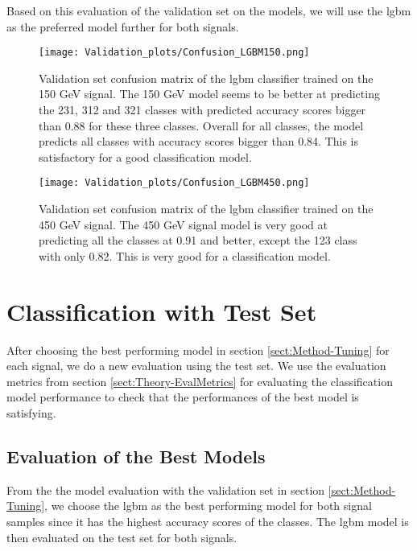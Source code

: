 \documentclass[a4paper, american, 12pt]{report}
\begin{document}
	Based on this evaluation of the validation set on the models, we will use the \acrshort{lgbm} as the preferred model further for both signals.
	\begin{figure}[t!]
		\centering\texttt{[image: Validation\_plots/Confusion\_LGBM150.png]}
		\caption[Validation set confusion matrix for the \acrshort{lgbm} model trained on the 150 GeV signal.]{Validation set confusion matrix of the \acrshort{lgbm} classifier trained on the 150 GeV signal. The 150 GeV model seems to be better at predicting the 231, 312 and 321 classes with predicted accuracy scores bigger than 0.88 for these three classes. Overall for all classes, the model predicts all classes with accuracy scores bigger than 0.84. This is satisfactory for a good classification model.  \label{fig:ConfVal_LGBM150}}
	\end{figure}
	\begin{figure}[t!]
		\centering\texttt{[image: Validation\_plots/Confusion\_LGBM450.png]}
		\caption[Validation set confusion matrix for the \acrshort{lgbm} model trained on the 450 GeV signal.]{Validation set confusion matrix of the \acrshort{lgbm} classifier trained on the 450 GeV signal. The 450 GeV signal model is very good at predicting all the classes at 0.91 and better, except the 123 class with only 0.82. This is very good for a classification model. \label{fig:ConfVal_LGBM450}}
	\end{figure}
	
	
	\newpage
	\section{Classification with Test Set}
	\label{sect:Method-BestModelEval}
	After choosing the best performing model in section \ref{sect:Method-Tuning} for each signal, we do a new evaluation using the test set.  We use the evaluation metrics from section \ref{sect:Theory-EvalMetrics} for evaluating the classification model performance to check that the performances of the best model is satisfying. 
	

	\subsection{Evaluation of the Best Models}
	\label{subsect:Method-TestResult}
	From the the model evaluation with the validation set in section \ref{sect:Method-Tuning}, we choose the \acrshort{lgbm} as the best performing model for both signal samples since it has the highest accuracy scores of the classes. The \acrshort{lgbm} model is then evaluated on the test set for both signals.
	
\end{document}
